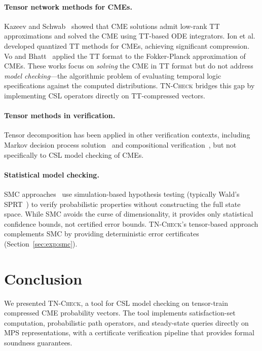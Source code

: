\documentclass[11pt]{article}
\newcommand{\tncheck}{\textsc{TN-Check}}
\begin{document}
\paragraph{Tensor network methods for CMEs.}
Kazeev and Schwab~\cite{kazeev2014} showed that CME solutions
admit low-rank TT approximations and solved the CME using
TT-based ODE integrators.
Ion et al.~\cite{ion2021} developed quantized TT methods
for CMEs, achieving significant compression.
Vo and Bhatt~\cite{vo2017} applied the TT format to
the Fokker-Planck approximation of CMEs.
These works focus on \emph{solving} the CME in TT format but do not
address \emph{model checking}---the algorithmic problem of evaluating
temporal logic specifications against the computed distributions.
\tncheck{} bridges this gap by implementing CSL operators directly
on TT-compressed vectors.

\paragraph{Tensor methods in verification.}
Tensor decomposition has been applied in other verification contexts,
including Markov decision process solution~\cite{buchholz2000} and
compositional verification~\cite{etessami2009}, but not specifically
to CSL model checking of CMEs.

\paragraph{Statistical model checking.}
SMC approaches~\cite{younes2006} use simulation-based hypothesis
testing (typically Wald's SPRT~\cite{wald1945}) to verify probabilistic
properties without constructing the full state space.
While SMC avoids the curse of dimensionality, it provides only
statistical confidence bounds, not certified error bounds.
\tncheck{}'s tensor-based approach complements SMC by providing
deterministic error certificates (Section~\ref{sec:exp:smc}).

\section{Conclusion}\label{sec:conclusion}

We presented \tncheck{}, a tool for CSL model checking on
tensor-train compressed CME probability vectors.
The tool implements satisfaction-set computation, probabilistic
path operators, and steady-state queries directly on MPS
representations, with a certificate verification pipeline that
provides formal soundness guarantees.
\end{document}
